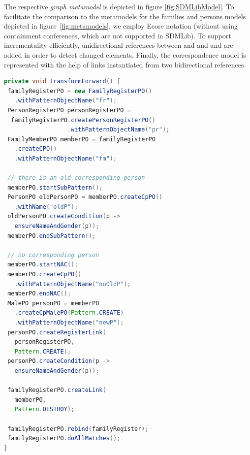 The respective \emph{graph metamodel} is depicted in figure \ref{fig:SDMLibModel}. To facilitate the comparison to the metamodels for the families and persons models depicted in figure~\ref{fig:metamodels}, we employ Ecore notation (without using containment conferences, which are not supported in SDMLib). To support incrementality efficiently, unidirectional references between  and  and  and  are added in order to detect changed elements. Finally, the correspondence model is represented with the help of links instantiated from two bidirectional references.





\begin{lstlisting}[label={lst:sdmlib}, float=hbt!, language=java, caption={Forward transformation in SDMLib}]
private void transformForward() {
 familyRegisterPO = new FamilyRegisterPO()
   .withPatternObjectName("fr");
 PersonRegisterPO personRegisterPO = 
  familyRegisterPO.createPersonRegisterPO()
                  .withPatternObjectName("pr");
 FamilyMemberPO memberPO = familyRegisterPO
   .createCPO()
   .withPatternObjectName("fm");

 // there is an old corresponding person
 memberPO.startSubPattern();
 PersonPO oldPersonPO = memberPO.createCpPO()
   .withName("oldP");
 oldPersonPO.createCondition(p -> 
   ensureNameAndGender(p));
 memberPO.endSubPattern();

 // no corresponding person
 memberPO.startNAC();
 memberPO.createCpPO()
   .withPatternObjectName("noOldP");
 memberPO.endNAC();
 MalePO personPO = memberPO
   .createCpMalePO(Pattern.CREATE)
   .withPatternObjectName("newP");
 personPO.createRegisterLink(
   personRegisterPO, 
   Pattern.CREATE);
 personPO.createCondition(p -> 
   ensureNameAndGender(p));
    
 familyRegisterPO.createLink(
   memberPO, 
   Pattern.DESTROY);

 familyRegisterPO.rebind(familyRegister);
 familyRegisterPO.doAllMatches();	    
}
\end{lstlisting}

